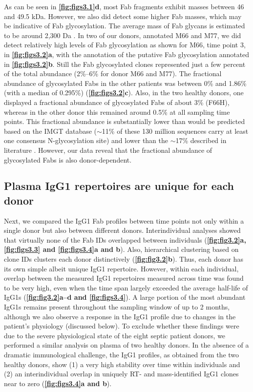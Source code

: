 As can be seen in \textbf{\autoref{fig:figs3.1}d}, most Fab fragments exhibit masses between 46 and 49.5 kDa. However, we also did detect some higher Fab masses, which may be indicative of Fab glycosylation. The average mass of Fab glycans is estimated to be around 2,300 Da \cite{bondt2016fab, hafkenscheid2017structural}. In two of our donors, annotated M66 and M77, we did detect relatively high levels of Fab glycosylation as shown for M66, time point 3, in \textbf{\autoref{fig:figs3.2}a}, with the annotation of the putative Fab glycosylation annotated in \textbf{\autoref{fig:figs3.2}b}. Still the Fab glycosylated clones represented just a few percent of the total abundance (2\%–6\% for donor M66 and M77). The fractional abundance of glycosylated Fabs in the other patients was between 0\% and 1.86\% (with a median of 0.295\%) (\textbf{\autoref{fig:figs3.2}c}). Also, in the two healthy donors, one displayed a fractional abundance of glycosylated Fabs of about 3\% (F66H), whereas in the other donor this remained around 0.5\% at all sampling time points. This fractional abundance is substantially lower than would be predicted based on the IMGT database ($\sim$11\% of these 130 million sequences carry at least one consensus N-glycosylation site) and lower than the $\sim$17\% described in literature \cite{bondt2016fab, hafkenscheid2017structural}. However, our data reveal that the fractional abundance of glycosylated Fabs is also donor-dependent.

\subsection{Plasma IgG1 repertoires are unique for each donor}
Next, we compared the IgG1 Fab profiles between time points not only within a single donor but also between different donors. Interindividual analyses showed that virtually none of the Fab IDs overlapped between individuals (\textbf{\autoref{fig:fig3.2}a, \autoref{fig:figs3.3} and \autoref{fig:figs3.4}a and b}). Also, hierarchical clustering based on clone IDs clusters each donor distinctively (\textbf{\autoref{fig:fig3.2}b}). Thus, each donor has its own simple albeit unique IgG1 repertoire. However, within each individual, overlap between the measured IgG1 repertoires measured across time was found to be very high, even when the time span largely exceeded the average half-life of IgG1s (\textbf{\autoref{fig:fig3.2}a–d and \autoref{fig:figs3.4}}). A large portion of the most abundant IgG1s remains present throughout the sampling window of up to 2 months, although we also observe a response in the IgG1 profile due to changes in the patient’s physiology (discussed below). To exclude whether these findings were due to the severe physiological state of the eight septic patient donors, we performed a similar analysis on plasma of two healthy donors. In the absence of a dramatic immunological challenge, the IgG1 profiles, as obtained from the two healthy donors, show (1) a very high stability over time within individuals and (2) an interindividual overlap in uniquely RT- and mass-identified IgG1 clones near to zero (\textbf{\autoref{fig:figs3.4}a and b}).


